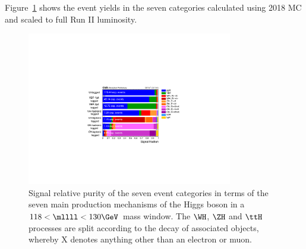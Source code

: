 Figure~\ref{fig:categ-purity} shows the event yields in the seven categories calculated using 2018 MC and scaled to full Run II luminosity.
\begin{figure}[!htb]
\vspace*{0.3cm}
\begin{center}
\includegraphics[width=0.8\textwidth]{Figures/stxs/Purity.pdf}
\caption{Signal relative purity of the seven event categories in terms of the seven main production mechanisms of the Higgs boson in a $118<\mllll<130\GeV$ mass window. The $\WH$, $\ZH$ and $\ttH$ processes are split according to the decay of associated objects, whereby X denotes anything other than an electron or muon.
\label{fig:categ-purity}}
\end{center}
\end{figure}
~

